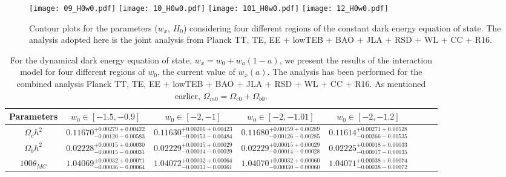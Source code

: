 \documentclass[superscriptaddress,oneolumn,secnumarabic,
amssymb,amsmath,nobibnotes,aps,prd,showpacs,nofootinbib]{revtex4}%
\begin{document}
\begin{itemize}
	\begin{figure}%
		\texttt{[image: 09\_H0w0.pdf]}
		\texttt{[image: 10\_H0w0.pdf]}
		\texttt{[image: 101\_H0w0.pdf]}
		\texttt{[image: 12\_H0w0.pdf]}
		\caption{Contour plots for the parameters ($w_x$, $H_0$) considering four different regions of the constant dark energy equation of state. The analysis adopted here is the joint analysis from Planck TT, TE, EE $+$ lowTEB $+$ BAO $+$ JLA $+$ RSD $+$ WL $+$ CC $+$ R16. }
		\label{fig:tension1}
	\end{figure}

\begin{table}%
\caption{For the dynamical dark energy
equation of state, $w_x = w_0 +w_a (1-a)$, we present the results of the interaction model for four different regions of $w_0$, the current value of $w_x(a)$. The analysis has been performed for
the combined analysis Planck TT, TE, EE $+$ lowTEB $+$ BAO $+$ JLA $+$ RSD $+$ WL $+$ CC $+$ R16.
As mentioned earlier, $\Omega_{m0}= \Omega_{c0}+\Omega_{b0}$. }
\begin{tabular}{cccccccc}
\hline\hline
Parameters & $w_0 \in [-1.5, -0.9]$ &  $w_0 \in [-2, -1]$ & $w_0 \in [-2, -1.01]$ &$w_0 \in [-2, -1.2]$
\\ \hline
$\Omega_c h^2$ & $ 0.11670_{-    0.00120-    0.00583}^{+    0.00279+    0.00422}$ & $    0.11630_{- 0.00153- 0.00484}^{+    0.00266+    0.00423}$ & $0.11680_{-    0.00126-    0.00285}^{+    0.00159+    0.00289}$ & $0.11614_{-    0.00266-    0.00535}^{+ 0.00271+    0.00528}$ \\

$\Omega_b h^2$ & $ 0.02228_{-    0.00015-    0.00031}^{+    0.00015+    0.00030}$ & $ 0.02229_{-    0.00014-    0.00029}^{+    0.00015+    0.00029}$ & $0.02229_{-    0.00014-    0.00028}^{+    0.00015+    0.00029}$ &$    0.02225_{-    0.00017-    0.00035}^{+    0.00018+    0.00033}$\\

$100\theta_{MC}$ & $ 1.04069_{- 0.00036- 0.00064}^{+    0.00032+    0.00071}$ & $ 1.04072_{- 0.00033- 0.00061}^{+ 0.00032+ 0.00064}$ & $1.04070_{-    0.00030-    0.00060}^{+    0.00032+    0.00060}$ & $ 1.04071_{-    0.00038-    0.00072}^{+    0.00038+    0.00074}$\\



\end{tabular}
\end{table}
\end{itemize}
\end{document}
